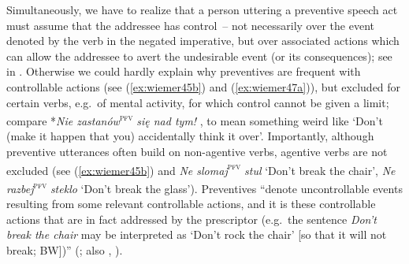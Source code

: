 \documentclass[output=paper,colorlinks,citecolor=brown]{langscibook}
\begin{document}
Simultaneously, we have to realize that a person uttering a preventive speech act must assume that the addressee has control~– not necessarily over the event denoted by the verb in the negated imperative, but over associated actions which can allow the addressee to avert the undesirable event (or its consequences); see  in . Otherwise we could hardly explain why preventives are frequent with controllable actions (see (\ref{ex:wiemer45b}) and (\ref{ex:wiemer47a})), but excluded for certain verbs, e.g.\ of mental activity, for which control cannot be given a limit; compare    *\textit{Nie zastanów}\textsc{\textsuperscript{pfv}} \textit{się nad tym!} \citep[103]{Holvoet1989}, to mean something weird like `Don't (make it happen that you) accidentally think it over'. Importantly, although preventive utterances often build on non-agentive verbs, agentive verbs are not excluded (see (\ref{ex:wiemer45b}) and  \textit{Ne slomaj}\textsc{\textsuperscript{pfv}} \textit{stul} `Don't break the chair', \textit{Ne razbej}\textsc{\textsuperscript{pfv}} \textit{steklo} `Don't break the glass'). Preventives ``denote uncontrollable events resulting from some relevant controllable actions, and it is these controllable actions that are in fact addressed by the prescriptor (e.g.\ the sentence \textit{Don't break the chair} may be interpreted as `Don't rock the chair' [so that it will not break; BW])'' (\citealt[38]{BirjulinXrakovskij2001}; also \citealt{Xrakovskij1990}, \citealt{Birjulin1992}).
\end{document}
